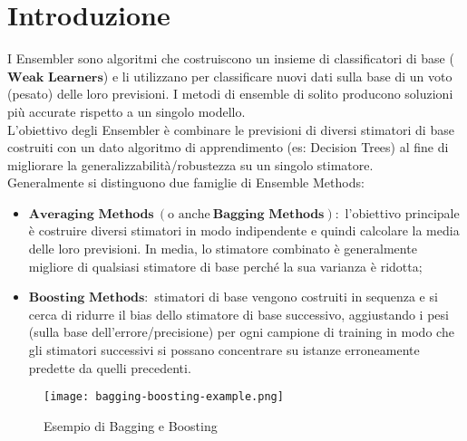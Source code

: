 \section{Introduzione}
    I Ensembler sono algoritmi che costruiscono un insieme di classificatori di base ($\textbf{Weak Learners}$) e li utilizzano per classificare nuovi dati sulla base di un voto (pesato) delle loro previsioni.
    I metodi di ensemble di solito producono soluzioni più accurate rispetto a un singolo modello.
    \\[1\baselineskip]
    L'obiettivo degli Ensembler è combinare le previsioni di diversi stimatori di base costruiti con un dato algoritmo di apprendimento (es: Decision Trees) al fine di migliorare la generalizzabilità/robustezza su un singolo stimatore.
    \\[1\baselineskip]
    Generalmente si distinguono due famiglie di Ensemble Methods:

    \begin{itemize}
        \item $\textbf{Averaging Methods}\ (\textrm{o anche}\ \textbf{Bagging Methods}):$ l'obiettivo principale è costruire diversi stimatori in modo indipendente e quindi calcolare la media delle loro previsioni. In media, lo stimatore combinato è generalmente migliore di qualsiasi stimatore di base perché la sua varianza è ridotta;
        \\[1\baselineskip]
        \item $\textbf{Boosting Methods}:$ stimatori di base vengono costruiti in sequenza e si cerca di ridurre il bias dello stimatore di base successivo, aggiustando i pesi (sulla base dell'errore/precisione) per ogni campione di training in modo che gli stimatori successivi si possano concentrare su istanze erroneamente predette da quelli precedenti.
    \end{itemize}

    \begin{figure}[h]
        \caption[short]{Esempio di Bagging e Boosting}
        \centering
        \texttt{[image: bagging-boosting-example.png]}
    \end{figure}

    \clearpage